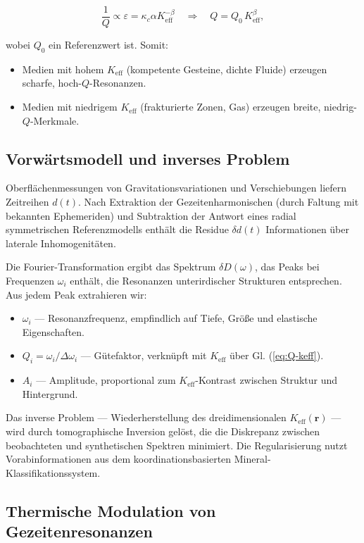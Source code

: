 \documentclass[12pt,a4paper]{article}
\theoremstyle{remark}
\newcommand{\Keff}{K_{\mathrm{eff}}}
\newcommand{\kappac}{\kappa_c}
\newcommand{\eps}{\varepsilon}
\begin{document}
	\begin{equation}
		\frac{1}{Q} \propto \eps = \kappac \alpha \Keff^{-\beta} \quad \Longrightarrow \quad Q = Q_0 \, \Keff^{\beta},
		\label{eq:Q-keff}
	\end{equation}
	
	wobei $Q_0$ ein Referenzwert ist. Somit:
	\begin{itemize}
		\item Medien mit hohem $\Keff$ (kompetente Gesteine, dichte Fluide) erzeugen scharfe, hoch-$Q$-Resonanzen.
		\item Medien mit niedrigem $\Keff$ (frakturierte Zonen, Gas) erzeugen breite, niedrig-$Q$-Merkmale.
	\end{itemize}
	
	\subsection{Vorwärtsmodell und inverses Problem}
	
	Oberflächenmessungen von Gravitationsvariationen und Verschiebungen liefern Zeitreihen $d(t)$. Nach Extraktion der Gezeitenharmonischen (durch Faltung mit bekannten Ephemeriden) und Subtraktion der Antwort eines radial symmetrischen Referenzmodells enthält die Residue $\delta d(t)$ Informationen über laterale Inhomogenitäten.
	
	Die Fourier-Transformation ergibt das Spektrum $\delta D(\omega)$, das Peaks bei Frequenzen $\omega_i$ enthält, die Resonanzen unterirdischer Strukturen entsprechen. Aus jedem Peak extrahieren wir:
	
	\begin{itemize}
		\item $\omega_i$ — Resonanzfrequenz, empfindlich auf Tiefe, Größe und elastische Eigenschaften.
		\item $Q_i = \omega_i / \Delta \omega_i$ — Gütefaktor, verknüpft mit $\Keff$ über Gl. (\ref{eq:Q-keff}).
		\item $A_i$ — Amplitude, proportional zum $\Keff$-Kontrast zwischen Struktur und Hintergrund.
	\end{itemize}
	
	Das inverse Problem — Wiederherstellung des dreidimensionalen $\Keff(\mathbf{r})$ — wird durch tomographische Inversion gelöst, die die Diskrepanz zwischen beobachteten und synthetischen Spektren minimiert. Die Regularisierung nutzt Vorabinformationen aus dem koordinationsbasierten Mineral-Klassifikationssystem.
	
	\subsection{Thermische Modulation von Gezeitenresonanzen}
	\label{sec:thermal-modulation}
	
\end{document}
